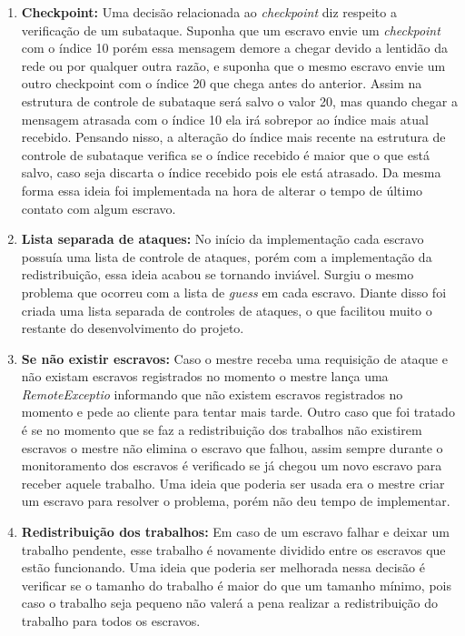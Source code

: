 \documentclass[
	12pt,				%
    oneside,			%
	a4paper,			%
	english,			%
	brazil,				%
	]{abntex2}
\begin{document}
\begin{enumerate}
	\item \textbf{Checkpoint:} Uma decisão relacionada ao \textit{checkpoint} diz respeito a verificação de um subataque.
	Suponha que um escravo envie um \textit{checkpoint} com o índice 10 porém essa mensagem demore a chegar devido a lentidão
	da rede ou por qualquer outra razão, e suponha que o mesmo escravo envie um outro checkpoint com o índice 20 que chega
	antes do anterior. Assim na estrutura de controle de subataque será salvo o valor 20, mas quando chegar a mensagem
	atrasada com o índice 10 ela irá sobrepor ao índice mais atual recebido. Pensando nisso, a alteração do índice mais
	recente na estrutura de controle de subataque verifica se o índice recebido é maior que o que está salvo, caso seja 
	discarta o índice recebido pois ele está atrasado. Da mesma forma essa ideia foi implementada na hora de alterar o
	tempo de último contato com algum escravo.	

	\item \textbf{Lista separada de ataques:} No início da implementação cada escravo possuía uma lista de controle de ataques,
	porém com a implementação da redistribuição, essa ideia acabou se tornando inviável. Surgiu o mesmo problema que ocorreu
	com a lista de \textit{guess} em cada escravo. Diante disso foi criada uma lista separada de controles de ataques, o que
	facilitou muito o restante do desenvolvimento do projeto.

	\item \textbf{Se não existir escravos:} Caso o mestre receba uma requisição de ataque e não existam escravos registrados
	no momento o mestre lança uma \textit{RemoteExceptio} informando que não existem escravos registrados no momento e
	pede ao cliente para tentar mais tarde. Outro caso que foi tratado é se no momento que se faz a redistribuição dos
	trabalhos não existirem escravos o mestre não elimina o escravo que falhou, assim sempre durante o monitoramento
	dos escravos é verificado se já chegou um novo escravo para receber aquele trabalho. Uma ideia que poderia ser usada era
	o mestre criar um escravo para resolver o problema, porém não deu tempo de implementar.
	
	\item \textbf{Redistribuição dos trabalhos:} Em caso de um escravo falhar e deixar um trabalho pendente, esse trabalho é
	novamente dividido entre os escravos que estão funcionando. Uma ideia que poderia ser melhorada nessa decisão é verificar
	se o tamanho do trabalho é maior do que um tamanho mínimo, pois caso o trabalho seja pequeno não valerá a pena
	realizar a redistribuição do trabalho para todos os escravos.

\end{enumerate}
\end{document}
